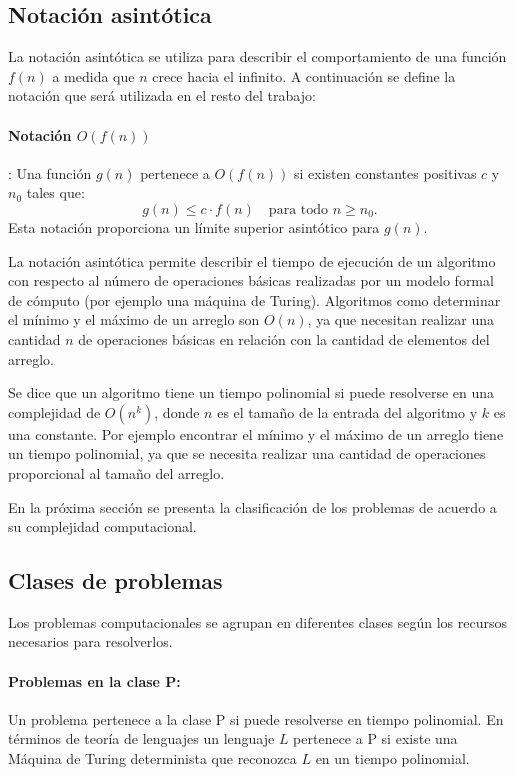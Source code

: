 \documentclass[12pt]{article}
\begin{document}
\subsection{Notación asintótica}

La notación asintótica se utiliza para describir el comportamiento de una función $f(n)$ a medida que $n$ crece hacia el infinito. 
A continuación se define la notación que será utilizada en el resto del trabajo:

\paragraph{Notación $O(f(n))$}: Una función $g(n)$ pertenece a $O(f(n))$ si existen constantes positivas $c$ y $n_0$ tales que:
\[
  g(n) \leq c \cdot f(n) \quad \text{para todo } n \geq n_0.
\]
Esta notación proporciona un límite superior asintótico para $g(n)$.

La notación asintótica permite describir el tiempo de ejecución de un algoritmo con respecto al número de 
operaciones básicas realizadas por un modelo formal de cómputo (por ejemplo una máquina de Turing). 
Algoritmos como determinar el mínimo y el máximo de un arreglo son $O(n)$, ya que necesitan realizar 
una cantidad $n$ de operaciones básicas en relación con la cantidad de elementos del arreglo.

Se dice que un algoritmo tiene un tiempo polinomial si puede resolverse en una complejidad de $O(n^k)$, donde $n$ es el tamaño de la entrada del algoritmo y $k$
es una constante. Por ejemplo encontrar el mínimo y el máximo de un arreglo tiene un tiempo polinomial, ya que se necesita realizar una cantidad de operaciones
proporcional al tamaño del arreglo.

En la próxima sección se presenta la clasificación de los problemas de acuerdo a su complejidad computacional.
\subsection{Clases de problemas}

Los problemas computacionales \cite{authomataTheory} se agrupan en diferentes clases según los recursos necesarios para resolverlos.

\paragraph{Problemas en la clase P:}
Un problema pertenece a la clase P si puede resolverse en tiempo polinomial. En términos de teoría de lenguajes un lenguaje
$L$ pertenece a P si existe una Máquina de Turing determinista que reconozca $L$ en un tiempo polinomial.
\end{document}
